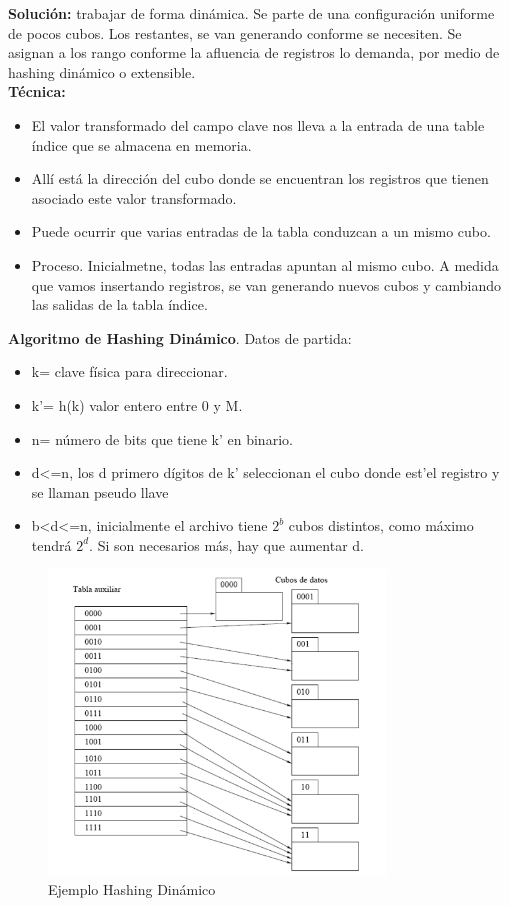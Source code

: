 \documentclass[a4paper,11pt]{article}
\begin{document}
\textbf{Solución:} trabajar de forma dinámica. Se parte de una configuración uniforme de pocos cubos. Los restantes, se van generando conforme se necesiten. Se asignan a los rango conforme la afluencia de registros lo demanda, por medio de hashing dinámico o extensible. \\

\textbf{Técnica:}

\begin{itemize}
\item El valor transformado del campo clave nos lleva a la entrada de una table índice que se almacena en memoria. 
\item Allí está la dirección del cubo donde se encuentran los registros que tienen asociado este valor transformado.
\item Puede ocurrir que varias entradas de la tabla conduzcan a un mismo cubo. 
\item Proceso. Inicialmetne, todas las entradas apuntan al mismo cubo. A medida que vamos insertando registros, se van generando nuevos cubos y cambiando las salidas de la tabla índice.
\end{itemize}

\textbf{Algoritmo de Hashing Dinámico}. Datos de partida:

\begin{itemize}
\item k= clave física para direccionar.
\item k'= h(k) valor entero entre 0 y M.
\item n= número de bits que tiene k' en binario.
\item d<=n, los d primero dígitos de k' seleccionan el cubo donde est'el registro y se llaman pseudo llave
\item b<d<=n, inicialmente el archivo tiene $2^b$ cubos distintos, como máximo tendrá $2^d$. Si son necesarios más, hay que aumentar d.
\end{itemize}

\begin{figure}
\centering
\caption{Ejemplo Hashing Dinámico}
\includegraphics[scale=1,width=0.8\textwidth]{hashing_dinamico.png}
\end{figure}
\end{document}
